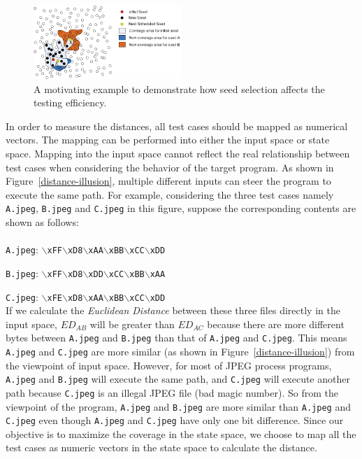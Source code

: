\documentclass{cta-author}
\begin{document}
\begin{figure}[!t]
	\centering
	\includegraphics[width=0.5\textwidth]{motivate-example.eps} 
	\caption{A motivating example to demonstrate how seed selection  
		affects the testing efficiency.}\label{motivate-example}
\end{figure}
In order to measure the distances, all test cases should be mapped 
as numerical vectors. 
The mapping can be performed into either the input space or state space. 
Mapping into the input space cannot reflect the real relationship between 
test cases when considering the behavior of the target program. 
As shown in Figure~\ref{distance-illusion}, multiple different 
inputs can steer the program to execute the same path. For example, 
considering the three test cases namely \texttt{A.jpeg}, \texttt{B.jpeg} 
and \texttt{C.jpeg} in this figure, suppose the corresponding contents 
are shown as follows:
\\
\\
\indent\texttt{A.jpeg}: \texttt{$\backslash$xFF$\backslash$xD8$\backslash$xAA$\backslash$xBB$\backslash$xCC$\backslash$xDD}

\texttt{B.jpeg}: \texttt{$\backslash$xFF$\backslash$xD8$\backslash$xDD$\backslash$xCC$\backslash$xBB$\backslash$xAA}

\texttt{C.jpeg}: \texttt{$\backslash$xFE$\backslash$xD8$\backslash$xAA$\backslash$xBB$\backslash$xCC$\backslash$xDD}
\\

\indent If we calculate the \textit{Euclidean Distance} between these 
three files directly in the input space, $ED_{AB}$ will be greater 
than $ED_{AC}$ because there are more different bytes between 
\texttt{A.jpeg} and \texttt{B.jpeg} than that of \texttt{A.jpeg} 
and \texttt{C.jpeg}. This means \texttt{A.jpeg} and \texttt{C.jpeg} 
are more similar (as shown in Figure~\ref{distance-illusion}) from 
the viewpoint of input space. 
However, for most of JPEG process programs, \texttt{A.jpeg} and 
\texttt{B.jpeg} will execute the same path, and \texttt{C.jpeg} 
will execute another path because \texttt{C.jpeg} is an illegal 
JPEG file (bad magic number). So from the viewpoint of the program, 
\texttt{A.jpeg} and \texttt{B.jpeg} are more similar than 
\texttt{A.jpeg} and \texttt{C.jpeg} even though \texttt{A.jpeg} 
and \texttt{C.jpeg} have only one bit difference. 
Since our objective is to maximize the coverage in the state space, 
we choose to map all the test cases as numeric vectors in the state 
space to calculate the distance.
\end{document}
